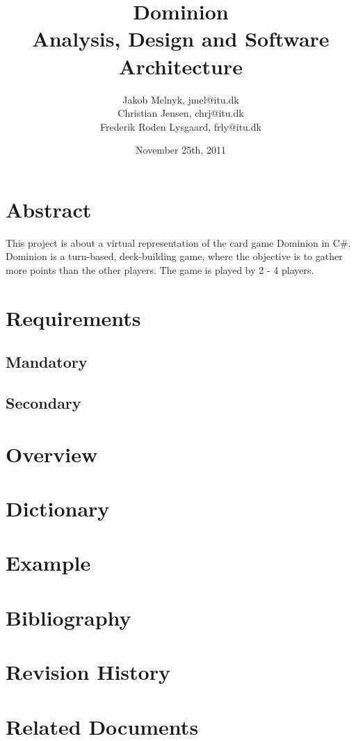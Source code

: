 \documentclass[11pt,a4paper,titlepage]{article}
\title{\huge{Dominion}\\
\large{Analysis, Design and Software Architecture}
}
\author{
Jakob Melnyk, jmel@itu.dk\\
Christian Jensen, chrj@itu.dk\\
Frederik Roden Lysgaard, frly@itu.dk
}
\date{November 25th, 2011}
\begin{document}
\tableofcontents
\pagebreak
\section{Abstract}
This project is about a virtual representation of the card game Dominion in C\#. Dominion is a turn-based, deck-building game, where the objective is to gather more points than the other players. The game is played by 2 - 4 players.
\section{Requirements}
\subsection{Mandatory}
\subsection{Secondary}
\section{Overview}
\section{Dictionary}
\section{Example}
\section{Bibliography}
\section{Revision History}
\section{Related Documents}
\end{document}
